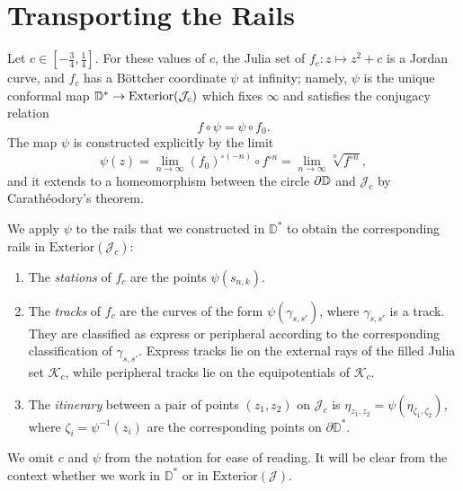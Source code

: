\section{Transporting the Rails} \label{rails-section}
Let $c\in\left[-\frac 34,\frac{1}{4}\right]$. For these values of $c$, the Julia set of $f_c: z\mapsto z^2+c$ is a Jordan curve, and $f_c$ has 
a Böttcher coordinate $\psi$ at infinity; 
namely, $\psi$ is the unique conformal map $\mathbb{D}^{*}\to\mathrm{Exterior}(\mathcal{J}_c)$  which fixes $\infty$ and satisfies the conjugacy relation 
$$
f\circ\psi=\psi\circ f_{0}.
$$
The map $\psi$ is constructed explicitly by the limit
$$\psi(z)=\lim_{n\to \infty} (f_0)^{\circ (-n)} \circ f^{\circ n}=\lim_{n\to \infty} \sqrt[n]{f^{\circ n}},$$
and it extends to a homeomorphism between the circle $\partial\mathbb{D}$ and $\mathcal{J}_c$ by Carathéodory's
theorem.



We apply $\psi$ to the rails that we constructed in $\mathbb D^*$ 
to obtain the corresponding rails in $\mathrm{Exterior}(\mathcal{J}_c)$:
\begin{definition} \leavevmode
\begin{enumerate}
	\item The 	\emph{stations} of $f_c$ are the points $\psi(s_{n,k})$.


\item The \emph{tracks} of $f_c$ are the curves of the form $\psi \left(\gamma_{s,s'}\right)$, where $\gamma_{s,s'}$ is a track. They are classified as express or peripheral according to the corresponding classification of $\gamma_{s,s'}$. 
Express tracks lie on the external rays of the filled Julia set $\mathcal K_c$, while peripheral tracks lie on the equipotentials of $\mathcal K_c$.

\item The \emph{itinerary} between a pair of points $(z_1,z_2)$ on $\mathcal J_c$ is
$\eta_{z_1,z_2}=\psi(\eta_{\zeta_1,\zeta_2})$, 
where $\zeta_i=\psi^{-1}(z_i)$ are the corresponding points on $\partial \mathbb D^*$. 
\end{enumerate}

We omit $c$ and $\psi$ from the notation for ease of reading. It will be clear from the context whether we work in $\mathbb D^*$ or in $\mathrm{Exterior}(\mathcal J)$.

\end{definition}


